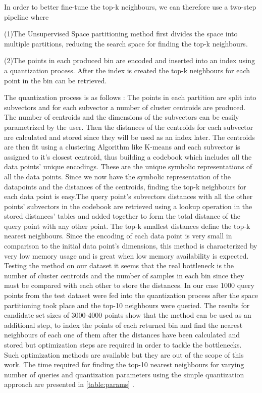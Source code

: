 \documentclass[sigconf, nonacm]{acmart}
\begin{document}
In order to better fine-tune the top-k neighbours, we can therefore use a two-step pipeline where

(1)The Unsupervised Space partitioning method first divides the space into multiple partitions, reducing the search space for finding the top-k neighbours.


(2)The points in each produced bin are encoded and inserted into an index using a quantization process. After the index is created the top-k neighbours for each point in the bin can be retrieved.

The quantization process is as follows : The points in each partition are split into subvectors and for each subvector a number of cluster centroids are produced. The number of centroids and the dimensions of the subvectors can be easily parametrized by the user. Then the distances of the centroids for each subvector are calculated and stored since they will be used as an index later. The centroids are then fit using a clustering Algorithm like K-means and each subvector is assigned to it's closest centroid, thus building a codebook which includes all the data points' unique encodings. These are the unique symbolic representations of all the data points. Since we now have the symbolic representation of the datapoints and the distances of the centroids, finding the top-k neighbours for each data point is easy.The query point's subvectors distances with all the other points' subvectors in the codebook are retrieved using a lookup operation in the stored distances' tables and added together to form the total distance of the query point with any other point. The top-k smallest distances define the top-k nearest neighbours. Since the encoding of each data point is very small in comparison to the initial data point's dimensions, this method is characterized by very low memory usage and is great when low memory availability is expected. Testing the method on our dataset it seems that the real bottleneck is the number of cluster centroids and the number of samples in each bin since they must be compared with each other to store the distances. In our case 1000 query points from the test dataset were fed into the quantization process after the space partitioning took place and the top-10 neighbours were queried. The results for candidate set sizes of 3000-4000 points show that the method can be used as an additional step, to index the points of each returned bin and find  the nearest neighbours of each one of them after the distances have been calculated and stored but optimization steps are required in order to tackle the bottlenecks. Such optimization methods are available\cite{opmethods} but they are out of the scope of this work. The time required for finding the top-10 nearest neighbours for varying number of queries and quantization parameters using the simple quantization approach are presented in \ref{table:params} .
\end{document}
